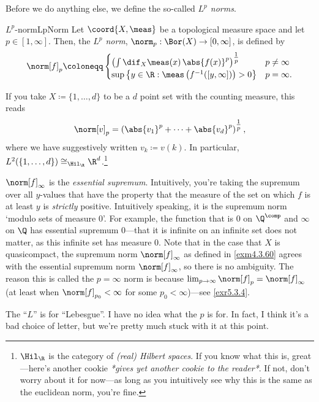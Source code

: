 Before we do anything else, we define the so-called \emph{$L^p$ norms}.
\begin{dfn}{$L^p$-norm}{LpNorm}
Let $\coord{X,\meas}$ be a topological measure space and let $p\in [1,\infty ]$.  Then, the \emph{$L^p$ norm}, $\norm _p:\Bor (X)\rightarrow [0,\infty ]$, is defined by
\begin{equation}
\norm[f]_p\coloneqq \begin{cases}\left( \int \dif _X\meas (x)\, \abs{f(x)}^p\right) ^{\tfrac{1}{p}} & p\neq \infty \\ \sup \left\{ y\in \R :\meas \left( f^{-1}([y,\infty ])\right) >0\right\} & p=\infty .\end{cases}
\end{equation}
\begin{rmk}
If you take $X\coloneqq \{1,\ldots ,d\}$ to be a $d$ point set with the counting measure, this reads
\begin{equation}
\norm[v]_p=\left( \abs{v_1}^p+\cdots +\abs{v_d}^p\right) ^{\tfrac{1}{p}},
\end{equation}
where we have suggestively written $v_k\coloneqq v(k)$.  In particular, $L^2(\{ 1,\ldots ,d\} )\cong _{\Hil _{\R}}\R ^d$.\footnote{$\Hil _{\R}$ is the category of \emph{(real) Hilbert spaces}.  If you know what this is, great---here's another cookie \emph{*gives yet another cookie to the reader*}.  If not, don't worry about it for now---as long as you intuitively see why this is the same as the euclidean norm, you're fine.}
\end{rmk}
\begin{rmk}
$\norm[f]_\infty$ is the \emph{essential supremum}.  Intuitively, you're taking the supremum over all $y$-values that have the property that the measure of the set on which $f$ is at least $y$ is \emph{strictly} positive.  Intuitively speaking, it is the supremum norm `modulo sets of measure $0$'.  For example, the function that is $0$ on $\Q ^{\comp}$ and $\infty$ on $\Q$ has essential supremum $0$---that it is infinite on an infinite set does not matter, as this infinite set has measure $0$.  Note that in the case that $X$ is quasicompact, the supremum norm $\norm[f]_\infty$ as defined in \cref{exm4.3.60} agrees with the essential supremum norm $\norm[f]_\infty$, so there is no ambiguity.  The reason this is called the $p=\infty$ norm is because $\lim _{p\to \infty}\norm[f]_p=\norm[f]_\infty$ (at least when $\norm[f]_{p_0}<\infty$ for some $p_0<\infty$)---see \cref{exr5.3.4}.
\end{rmk}
\begin{rmk}
The ``$L$'' is for ``Lebesgue''.  I have no idea what the $p$ is for.  In fact, I think it's a bad choice of letter, but we're pretty much stuck with it at this point.
\end{rmk}
\end{dfn}

